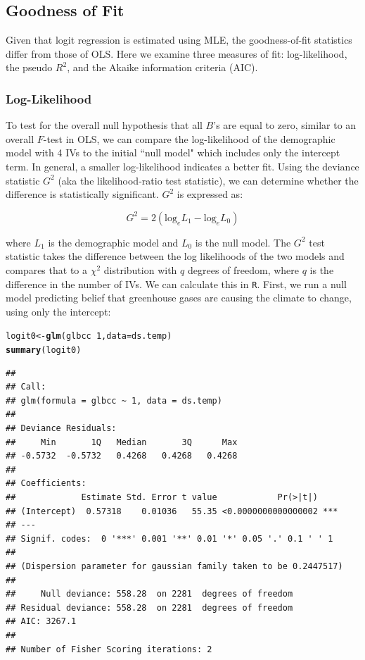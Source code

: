 \documentclass[11pt,openany]{book}\usepackage[]{graphicx}\usepackage[]{color}
\makeatletter
\newcommand{\hlnum}[1]{\textcolor[rgb]{0.686,0.059,0.569}{#1}}%
\newcommand{\hlopt}[1]{\textcolor[rgb]{0,0,0}{#1}}%
\newcommand{\hlstd}[1]{\textcolor[rgb]{0.345,0.345,0.345}{#1}}%
\newcommand{\hlkwb}[1]{\textcolor[rgb]{0.69,0.353,0.396}{#1}}%
\newcommand{\hlkwc}[1]{\textcolor[rgb]{0.333,0.667,0.333}{#1}}%
\newcommand{\hlkwd}[1]{\textcolor[rgb]{0.737,0.353,0.396}{\textbf{#1}}}%
\newenvironment{kframe}{%
 \def\at@end@of@kframe{}%
 \ifinner\ifhmode%
  \def\at@end@of@kframe{\end{minipage}}%
  \begin{minipage}{\columnwidth}%
 \fi\fi%
 \def\FrameCommand##1{\hskip\@totalleftmargin \hskip-\fboxsep
 \colorbox{shadecolor}{##1}\hskip-\fboxsep
     \hskip-\linewidth \hskip-\@totalleftmargin \hskip\columnwidth}%
 \MakeFramed {\advance\hsize-\width
   \@totalleftmargin\z@ \linewidth\hsize
   \@setminipage}}%
 {\par\unskip\endMakeFramed%
 \at@end@of@kframe}
\newenvironment{knitrout}{}{} %
\renewenvironment{knitrout}{\begin{singlespace}}{\end{singlespace}}
\makeatother
\begin{document}
\subsection{Goodness of Fit} 

Given that logit regression is estimated using MLE, the goodness-of-fit statistics differ from those of OLS. Here we examine three
measures of fit: log-likelihood, the pseudo $R^2$, and the Akaike information criteria (AIC). 

\subsubsection{Log-Likelihood}
To test for the overall null hypothesis that all $B$’s are equal to zero, similar to an overall $F$-test in OLS, we can compare the log-likelihood of the demographic model with 4 IVs to the initial ``null model" which includes only the intercept term. In general, a smaller log-likelihood indicates a better fit. Using the deviance statistic $G^2$ (aka the likelihood-ratio test statistic), we can determine whether the difference
is statistically significant. $G^2$ is expressed as: 

 \begin{equation}
   \label{eq:G}
   G^2 = 2(\text{log}_e L_1 - \text{log}_e L_0)
\end{equation}

\noindent where $L_1$ is the demographic model and $L_0$ is the null model. The $G^2$ test statistic takes the difference between the log likelihoods of the two models and compares that to a $\chi^2$ distribution with $q$ degrees of freedom, where $q$ is the difference in the number of IVs. We can calculate this in \texttt{R}.  First, we run a null model predicting belief that greenhouse gases are causing the climate to change, using only
the intercept:

\begin{knitrout}
\color{fgcolor}\begin{kframe}
\begin{alltt}
\hlstd{logit0} \hlkwb{<-} \hlkwd{glm}\hlstd{(glbcc} \hlopt{~} \hlnum{1}\hlstd{,} \hlkwc{data} \hlstd{= ds.temp)}
\hlkwd{summary}\hlstd{(logit0)}
\end{alltt}
\begin{verbatim}
## 
## Call:
## glm(formula = glbcc ~ 1, data = ds.temp)
## 
## Deviance Residuals: 
##     Min       1Q   Median       3Q      Max  
## -0.5732  -0.5732   0.4268   0.4268   0.4268  
## 
## Coefficients:
##             Estimate Std. Error t value            Pr(>|t|)    
## (Intercept)  0.57318    0.01036   55.35 <0.0000000000000002 ***
## ---
## Signif. codes:  0 '***' 0.001 '**' 0.01 '*' 0.05 '.' 0.1 ' ' 1
## 
## (Dispersion parameter for gaussian family taken to be 0.2447517)
## 
##     Null deviance: 558.28  on 2281  degrees of freedom
## Residual deviance: 558.28  on 2281  degrees of freedom
## AIC: 3267.1
## 
## Number of Fisher Scoring iterations: 2
\end{verbatim}
\end{kframe}
\end{knitrout}
\end{document}
